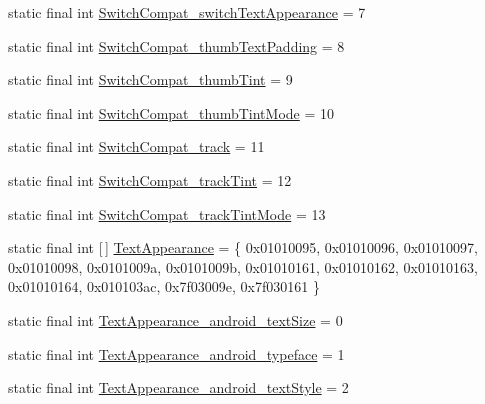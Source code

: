 \begin{DoxyCompactItemize}
static final int \mbox{\hyperlink{classandroid_1_1support_1_1v7_1_1appcompat_1_1R_1_1styleable_a57a3f7e1a364acd3c1edf62eb9b9c16e}{Switch\+Compat\+\_\+switch\+Text\+Appearance}} = 7
\item 
static final int \mbox{\hyperlink{classandroid_1_1support_1_1v7_1_1appcompat_1_1R_1_1styleable_a52784edfe08100afcff5bfe80a6fce81}{Switch\+Compat\+\_\+thumb\+Text\+Padding}} = 8
\item 
static final int \mbox{\hyperlink{classandroid_1_1support_1_1v7_1_1appcompat_1_1R_1_1styleable_a945d8ada8cec50a497fcbaf48ffb8a17}{Switch\+Compat\+\_\+thumb\+Tint}} = 9
\item 
static final int \mbox{\hyperlink{classandroid_1_1support_1_1v7_1_1appcompat_1_1R_1_1styleable_a0bcfbbc3f6e907853e2111714a277e95}{Switch\+Compat\+\_\+thumb\+Tint\+Mode}} = 10
\item 
static final int \mbox{\hyperlink{classandroid_1_1support_1_1v7_1_1appcompat_1_1R_1_1styleable_a4a2d08a3045d8d919d6e643add8b6d8c}{Switch\+Compat\+\_\+track}} = 11
\item 
static final int \mbox{\hyperlink{classandroid_1_1support_1_1v7_1_1appcompat_1_1R_1_1styleable_a56779e8105a70956e34ce70d9f11ea6a}{Switch\+Compat\+\_\+track\+Tint}} = 12
\item 
static final int \mbox{\hyperlink{classandroid_1_1support_1_1v7_1_1appcompat_1_1R_1_1styleable_a5298c4251559de5ddbb9ca8aa1f3cd02}{Switch\+Compat\+\_\+track\+Tint\+Mode}} = 13
\item 
static final int \mbox{[}$\,$\mbox{]} \mbox{\hyperlink{classandroid_1_1support_1_1v7_1_1appcompat_1_1R_1_1styleable_a85d64ca373dd3c60f50e0e9c1a55a8da}{Text\+Appearance}} = \{ 0x01010095, 0x01010096, 0x01010097, 0x01010098, 0x0101009a, 0x0101009b, 0x01010161, 0x01010162, 0x01010163, 0x01010164, 0x010103ac, 0x7f03009e, 0x7f030161 \}
\item 
static final int \mbox{\hyperlink{classandroid_1_1support_1_1v7_1_1appcompat_1_1R_1_1styleable_af9f0bc5e4de5b5a13cf249d520135f6b}{Text\+Appearance\+\_\+android\+\_\+text\+Size}} = 0
\item 
static final int \mbox{\hyperlink{classandroid_1_1support_1_1v7_1_1appcompat_1_1R_1_1styleable_a85b8be9cd5f70a43e5fd407b3048916e}{Text\+Appearance\+\_\+android\+\_\+typeface}} = 1
\item 
static final int \mbox{\hyperlink{classandroid_1_1support_1_1v7_1_1appcompat_1_1R_1_1styleable_aeacc55fa755882a9ea3f4afe39049916}{Text\+Appearance\+\_\+android\+\_\+text\+Style}} = 2
\item 

\end{DoxyCompactItemize}
